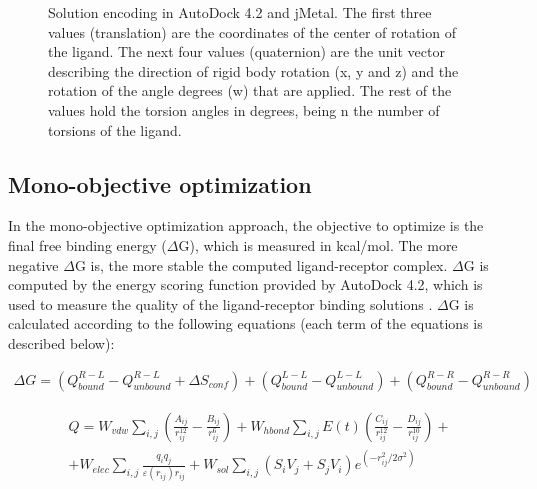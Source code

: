 \begin{figure}[H] %
\vspace{0.5cm} \centering {}
\caption[Solution encoding in AutoDock 4.2 and jMetal.]{Solution encoding in AutoDock 4.2 and jMetal. The first three values (translation) are the coordinates of the center of rotation of the ligand. The next four values (quaternion) are the unit vector describing the direction of rigid body rotation (x, y and z) and the rotation of the angle degrees (w) that are applied. The rest of the values hold the torsion angles in degrees, being n the number of torsions of the ligand.}\label{img.docking.fig:solution} \vspace{0.6cm}
\end{figure}

\subsection{Mono-objective optimization}
\label{subsection:mono_solution}

In the mono-objective optimization approach, the objective to optimize is the final free binding energy ($\Delta$G), which is measured in kcal/mol. The more negative $\Delta$G is, the more stable the computed ligand-receptor complex. $\Delta$G is computed by the energy scoring function provided by AutoDock 4.2, which is used to measure the quality of the ligand-receptor binding solutions \cite{Morris2009}. $\Delta$G is calculated according to the following equations (each term of the equations is described below):

\begin{equation}
\label{eq:equation-docking-mono-1}
\begin{split}
\Delta G = (Q_{bound}^{R-L} - Q_{unbound}^{R-L} + \Delta S_{conf}) + (Q_{bound}^{L-L} - Q_{unbound}^{L-L}) + (Q_{bound}^{R-R} - Q_{unbound}^{R-R}) 
\end{split}
\end{equation}

\begin{equation}
\label{eq:equation-docking-mono-2}
\begin{split}
Q = W_{vdw} \sum_{i,j} (\frac{A_{ij}}{r_{ij}^{12}} - \frac{B_{ij}}{r_{ij}^{6}}) + W_{hbond} \sum_{i,j} E(t) \left( \frac{C_{ij}}{r_{ij}^{12}} - \frac{D_{ij}}{r_{ij}^{10}} \right) + \\
+ W_{elec} \sum_{i,j} \frac{q_i q_j}{\varepsilon(r_{ij})r_{ij}} + W_{sol}\sum_{i,j}(S_i V_j + S_j V_i)e^{(-r_{ij}^2/2\sigma^2)}
\end{split}
\end{equation}

